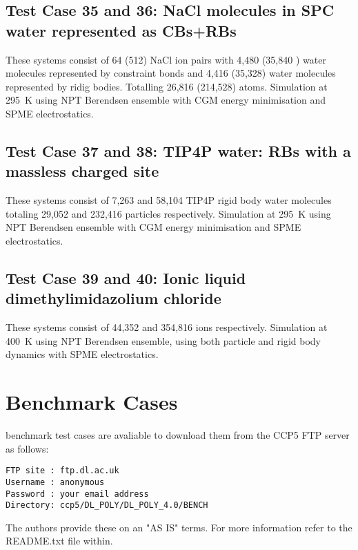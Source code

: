 \subsection{Test Case 35 and 36: NaCl molecules in SPC water represented as CBs+RBs}

These systems consist of 64 (512) NaCl ion pairs with 4,480 (35,840
) water molecules represented by constraint bonds and 4,416 (35,328)
water molecules represented by ridig bodies.  Totalling 26,816 (214,528)
atoms.  Simulation at 295~K using NPT Berendsen ensemble with CGM energy
minimisation and SPME electrostatics.

\subsection{Test Case 37 and 38: TIP4P water: RBs with a massless charged site}

These systems consist of 7,263 and 58,104 TIP4P rigid body water molecules
totaling 29,052 and 232,416 particles respectively.  Simulation at 295~K
using NPT Berendsen ensemble with CGM energy minimisation and SPME electrostatics.

\subsection{Test Case 39 and 40: Ionic liquid dimethylimidazolium chloride}

These systems consist of 44,352 and 354,816 ions respectively.  Simulation
at 400~K using NPT Berendsen ensemble, using both particle and rigid body
dynamics with SPME electrostatics.

\section{Benchmark Cases}

\D benchmark test cases are avaliable to download them from the CCP5 FTP
server as follows:

\begin{verbatim}
FTP site : ftp.dl.ac.uk
Username : anonymous
Password : your email address
Directory: ccp5/DL_POLY/DL_POLY_4.0/BENCH
\end{verbatim}

The \D authors provide these on an "AS IS" terms.  For more information
refer to the README.txt file within.
